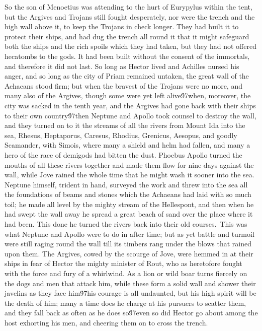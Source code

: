 {  So the son of Menoetius was attending to the hurt of Eurypylus within the tent, but the Argives and Trojans still fought desperately, nor were the trench and the high wall above it, to keep the Trojans in check longer. They had built it to protect their ships, and had dug the trench all round it that it might safeguard both the ships and the rich spoils which they had taken, but they had not offered hecatombs to the gods. It had been built without the consent of the immortals, and therefore it did not last. So long as Hector lived and Achilles nursed his anger, and so long as the city of Priam remained untaken, the great wall of the Achaeans stood firm; but when the bravest of the Trojans were no more, and many also of the Argives, though some were yet left alive\'97when, moreover, the city was sacked in the tenth year, and the Argives had gone back with their ships to their own country\'97then Neptune and Apollo took counsel to destroy the wall, and they turned on to it the streams of all the rivers from Mount Ida into the sea, Rhesus, Heptaporus, Caresus, Rhodius, Grenicus, Aesopus, and goodly Scamander, with Simois, where many a shield and helm had fallen, and many a hero of the race of demigods had bitten the dust. Phoebus Apollo turned the mouths of all these rivers together and made them flow for nine days against the wall, while Jove rained the whole time that he might wash it sooner into the sea. Neptune himself, trident in hand, surveyed the work and threw into the sea all the foundations of beams and stones which the Achaeans had laid with so much toil; he made all level by the mighty stream of the Hellespont, and then when he had swept the wall away he spread a great beach of sand over the place where it had been. This done he turned the rivers back into their old courses.\
This was what Neptune and Apollo were to do in after time; but as yet battle and turmoil were still raging round the wall till its timbers rang under the blows that rained upon them. The Argives, cowed by the scourge of Jove, were hemmed in at their ships in fear of Hector the mighty minister of Rout, who as heretofore fought with the force and fury of a whirlwind. As a lion or wild boar turns fiercely on the dogs and men that attack him, while these form a solid wall and shower their javelins as they face him\'97his courage is all undaunted, but his high spirit will be the death of him; many a time does he charge at his pursuers to scatter them, and they fall back as often as he does so\'97even so did Hector go about among the host exhorting his men, and cheering them on to cross the trench.\
}
